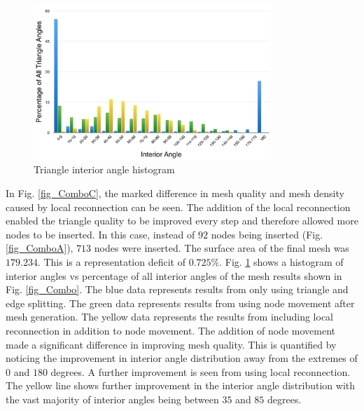 \begin{figure}[h!]
  \begin{center}
  \includegraphics[width=90mm]{Figures/MeshQuality.png}
  \caption{Triangle interior angle histogram}
  \label{fig_MeshQuality}
  \end{center}
\end{figure}

In Fig. \ref{fig_ComboC}, the marked difference in mesh quality and mesh
density caused by local reconnection can be seen. The addition of the
local reconnection enabled the triangle quality to be improved every
step and therefore allowed more nodes to be inserted. In this case,
instead of $92$ nodes being inserted (Fig. \ref{fig_ComboA}), $713$
nodes were inserted. The surface area of the final mesh was $179.234$.
This is a representation deficit of $0.725\%$.  Fig.
\ref{fig_MeshQuality} shows a histogram of interior angles vs percentage
of all interior angles of the mesh results shown in Fig.
\ref{fig_Combo}. The blue data represents results from only using
triangle and edge splitting. The green data represents results from
using node movement after mesh generation. The yellow data represents
the results from including local reconnection in addition to node
movement. The addition of node movement made a significant difference in
improving mesh quality. This is quantified by noticing the improvement
in interior angle distribution away from the extremes of $0$ and $180$
degrees. A further improvement is seen from using local reconnection.
The yellow line shows further improvement in the interior angle
distribution with the vast majority of interior angles being between
$35$ and $85$ degrees.

